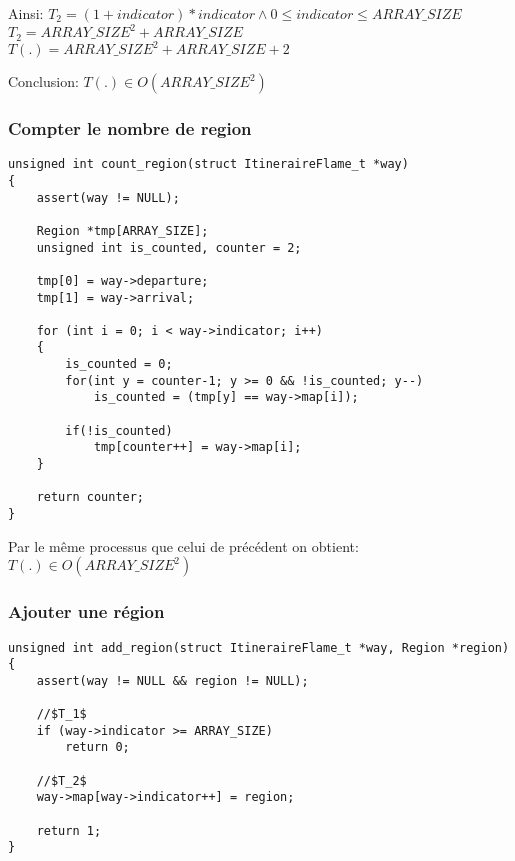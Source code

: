 Ainsi:
$T_2=(1 + indicator)*indicator \land 0 \le indicator \le ARRAY\_SIZE$
\newline
$T_2=ARRAY\_SIZE^2 + ARRAY\_SIZE$ 
\newline
$T(.) = ARRAY\_SIZE^2 + ARRAY\_SIZE + 2$

Conclusion: $T(.) \in O(ARRAY\_SIZE^2)$



\subsubsection{Compter le nombre de region}

\begin{lstlisting}
unsigned int count_region(struct ItineraireFlame_t *way)
{
    assert(way != NULL);

    Region *tmp[ARRAY_SIZE];
    unsigned int is_counted, counter = 2;

    tmp[0] = way->departure;
    tmp[1] = way->arrival;

    for (int i = 0; i < way->indicator; i++)
    {
        is_counted = 0;
        for(int y = counter-1; y >= 0 && !is_counted; y--)
            is_counted = (tmp[y] == way->map[i]);
        
        if(!is_counted)
            tmp[counter++] = way->map[i];
    }
    
    return counter;
}
\end{lstlisting}

Par le même processus que celui de précédent on obtient: $T(.) \in O(ARRAY\_SIZE^2)$


\subsubsection{Ajouter une région}

\begin{lstlisting}
unsigned int add_region(struct ItineraireFlame_t *way, Region *region)
{
    assert(way != NULL && region != NULL);
    
    //$T_1$
    if (way->indicator >= ARRAY_SIZE)
        return 0;

    //$T_2$
    way->map[way->indicator++] = region;

    return 1;
}
\end{lstlisting}

